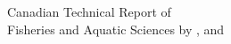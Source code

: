 \normalsize
{}
\thispagestyle{empty}
\noindent
\begin{center}
Canadian Technical Report of\\
Fisheries and Aquatic Sciences \trReportNum{}
\vfill
\trYear{}
\vfill
\MakeTextUppercase{\trTitle{}}
\vfill
by
\vfill
\trAuthALong{}, and \trAuthBLong{}
\vfill
\trAddy{}
\end{center}
\clearpage
